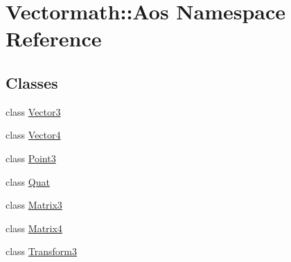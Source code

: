 \hypertarget{namespaceVectormath_1_1Aos}{\section{Vectormath\-:\-:Aos Namespace Reference}
\label{namespaceVectormath_1_1Aos}
}
\subsection*{Classes}
\begin{DoxyCompactItemize}
\item 
class \hyperlink{classVectormath_1_1Aos_1_1Vector3}{Vector3}
\item 
class \hyperlink{classVectormath_1_1Aos_1_1Vector4}{Vector4}
\item 
class \hyperlink{classVectormath_1_1Aos_1_1Point3}{Point3}
\item 
class \hyperlink{classVectormath_1_1Aos_1_1Quat}{Quat}
\item 
class \hyperlink{classVectormath_1_1Aos_1_1Matrix3}{Matrix3}
\item 
class \hyperlink{classVectormath_1_1Aos_1_1Matrix4}{Matrix4}
\item 
class \hyperlink{classVectormath_1_1Aos_1_1Transform3}{Transform3}
\end{DoxyCompactItemize}
